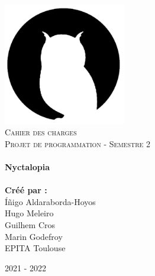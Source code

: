 \begin{titlepage}
    \vbox{ }

    \vbox{ }

    \begin{center}
        \includegraphics[width=0.40\textwidth]{img/gamehub.png}\\[1cm]
        \textsc{\Large Cahier des charges}\\[0.2cm]
        \textsc{\Large Projet de programmation - Semestre 2}\\[0.6cm]

        \noindent\makebox[\linewidth]{\rule{.7\paperwidth}{.6pt}}\\[0.7cm]
        { \huge \bfseries Nyctalopia}\\[0.25cm]
        \noindent\makebox[\linewidth]{\rule{.7\paperwidth}{.6pt}}\\[0.7cm]
        \large{\bfseries Créé par :}\\[0.1cm]
        \large{Íñigo Aldaraborda-Hoyos}\\[0.1cm]
        \large{Hugo Meleiro}\\[0.1cm]
        \large{Guilhem Cros}\\[0.1cm]
        \large{Marin Godefroy}\\[0.1cm]
        \vfill
        \large
        EPITA Toulouse

            {\large 2021 - 2022}
    \end{center}
\end{titlepage}

